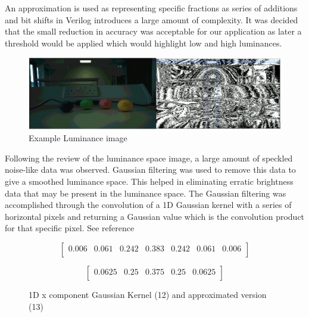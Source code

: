 \documentclass[10pt,twoside]{article}
\begin{document}
An approximation is used as representing specific fractions as series of additions and bit shifts in Verilog introduces a large amount of complexity. It was decided that the small reduction in accuracy was acceptable for our application as later a threshold would be applied which would highlight low and high luminances.

\begin{figure}[hbt]
\includegraphics[scale = 0.3]{ExampleLuminance.PNG}
\centering
\caption{Example Luminance image }
\label{fig:LuminanceImg}
\end{figure}


Following the review of the luminance space image, a large amount of speckled noise-like data was observed. Gaussian filtering was used to remove this data to give a smoothed luminance space. This helped in eliminating erratic brightness data that may be present in the luminance space. The Gaussian filtering was accomplished through the convolution of a 1D Gaussian kernel with a series of horizontal pixels and returning a Gaussian value which is the convolution product for that specific pixel. See reference \cite{SpatialSmoothing}

\begin{figure}[hbt]
    \begin{minipage}{.55\textwidth}
    \begin{equation}
        \begin{bmatrix}
        0.006 & 0.061 & 0.242 & 0.383 & 0.242  & 0.061  & 0.006 \\
    \end{bmatrix}
    \end{equation}
    \end{minipage}
    \begin{minipage}{.39\textwidth}
    \begin{equation}
        \begin{bmatrix}
        0.0625  & 0.25 & 0.375 & 0.25  & 0.0625 \\
        \end{bmatrix}
    \end{equation}
    \end{minipage}
    \caption{1D x component Gaussian Kernel (12)  and  approximated version (13)}
\end{figure}
\end{document}
